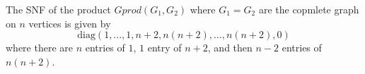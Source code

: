\begin{theorem}
    The SNF of the product $Gprod(G_1,G_2)$ where $G_1 = G_2$ are the copmlete graph on $n$ vertices is given by $$\text{diag}(1,...,1,n+2,n (n+2),...,n (n+2),0)$$ where there are $n$ entries of $1$, $1$ entry of $n+2$, and then $n-2$ entries of $n(n+2)$.
\end{theorem}